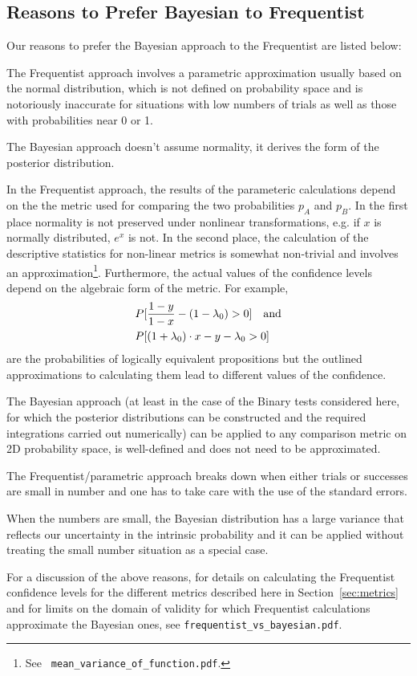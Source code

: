 \documentclass[letterpaper,12pt]{article}
\newcommand{\beq}{\begin{equation}} %
\newcommand{\eeq}{\end{equation}} %
\begin{document}
\subsection{Reasons to Prefer Bayesian to Frequentist}\label{sec:bayes_over_freq}
Our reasons to prefer the Bayesian approach to the Frequentist are listed below:
\be
\item The Frequentist approach involves a parametric approximation
  usually based on the normal distribution, which is not defined on
  probability space and is notoriously inaccurate for situations with
  low numbers of trials as well as those with probabilities near 0 or
  1.

  The Bayesian approach doesn't assume normality, it derives the
  form of the posterior distribution.
\item In the Frequentist approach, the results of the parameteric
  calculations depend on the the metric used for comparing the two
  probabilities \(p_A\) and \(p_B\). In the first place normality is
  not preserved under nonlinear transformations, e.g. if \(x\) is
  normally distributed, \(e^x\) is not. In the second place, the
  calculation of the descriptive statistics for non-linear metrics is
  somewhat non-trivial and involves an approximation\footnote{See {\tt
      mean\_variance\_of\_function.pdf}.}. Furthermore, the actual
  values of the confidence levels depend on the algebraic form of the
  metric. For example,
  \beq
  \begin{split}
    &P[\frac{1-y}{1-x} - (1-\lambda_0)>0]\quad{\rm and}\\
    &P[(1+\lambda_0)\cdot x -y-\lambda_0>0]
  \end{split}
  \eeq
  are the probabilities of logically equivalent propositions but
  the outlined approximations to calculating them lead to different
  values of the confidence.

  The Bayesian approach (at least in the case of the Binary tests
  considered here, for which the posterior distributions can be
  constructed and the required integrations carried out numerically)
  can be applied to any comparison metric on 2D probability space, is
  well-defined and does not need to be approximated.
  \item The Frequentist/parametric approach breaks down when either
    trials or successes are small in number and one has to take care
    with the use of the standard errors.

    When the numbers are small, the Bayesian distribution has a large
    variance that reflects our uncertainty in the intrinsic
    probability and it can be applied without treating the small
    number situation as a special case.
    \ee

For a discussion of the above reasons, for details on calculating the
Frequentist confidence levels for the different metrics described here
in Section~\ref{sec:metrics} and for limits on the domain of validity
for which Frequentist calculations approximate the Bayesian ones, see
{\tt frequentist\_vs\_bayesian.pdf}.
\end{document}
